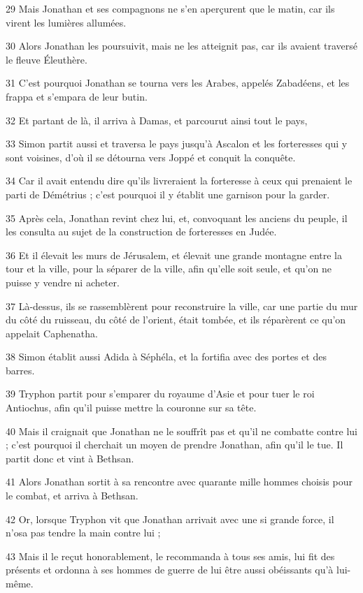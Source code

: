 \par 29 Mais Jonathan et ses compagnons ne s'en aperçurent que le matin, car ils virent les lumières allumées.
\par 30 Alors Jonathan les poursuivit, mais ne les atteignit pas, car ils avaient traversé le fleuve Éleuthère.
\par 31 C'est pourquoi Jonathan se tourna vers les Arabes, appelés Zabadéens, et les frappa et s'empara de leur butin.
\par 32 Et partant de là, il arriva à Damas, et parcourut ainsi tout le pays,
\par 33 Simon partit aussi et traversa le pays jusqu'à Ascalon et les forteresses qui y sont voisines, d'où il se détourna vers Joppé et conquit la conquête.
\par 34 Car il avait entendu dire qu'ils livreraient la forteresse à ceux qui prenaient le parti de Démétrius ; c'est pourquoi il y établit une garnison pour la garder.
\par 35 Après cela, Jonathan revint chez lui, et, convoquant les anciens du peuple, il les consulta au sujet de la construction de forteresses en Judée.
\par 36 Et il élevait les murs de Jérusalem, et élevait une grande montagne entre la tour et la ville, pour la séparer de la ville, afin qu'elle soit seule, et qu'on ne puisse y vendre ni acheter.
\par 37 Là-dessus, ils se rassemblèrent pour reconstruire la ville, car une partie du mur du côté du ruisseau, du côté de l'orient, était tombée, et ils réparèrent ce qu'on appelait Caphenatha.
\par 38 Simon établit aussi Adida à Séphéla, et la fortifia avec des portes et des barres.
\par 39 Tryphon partit pour s'emparer du royaume d'Asie et pour tuer le roi Antiochus, afin qu'il puisse mettre la couronne sur sa tête.
\par 40 Mais il craignait que Jonathan ne le souffrît pas et qu'il ne combatte contre lui ; c'est pourquoi il cherchait un moyen de prendre Jonathan, afin qu'il le tue. Il partit donc et vint à Bethsan.
\par 41 Alors Jonathan sortit à sa rencontre avec quarante mille hommes choisis pour le combat, et arriva à Bethsan.
\par 42 Or, lorsque Tryphon vit que Jonathan arrivait avec une si grande force, il n'osa pas tendre la main contre lui ;
\par 43 Mais il le reçut honorablement, le recommanda à tous ses amis, lui fit des présents et ordonna à ses hommes de guerre de lui être aussi obéissants qu'à lui-même.
